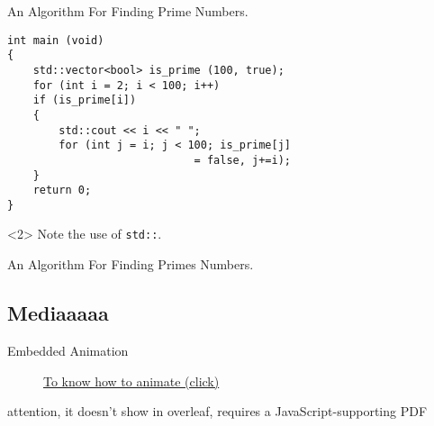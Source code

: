 \begin{frame}[fragile]{An Algorithm For Finding Prime Numbers.} %
    \begin{verbatim} 
int main (void)
{
    std::vector<bool> is_prime (100, true);
    for (int i = 2; i < 100; i++)
    if (is_prime[i])
    {
        std::cout << i << " ";
        for (int j = i; j < 100; is_prime[j]
                             = false, j+=i);
    }
    return 0;
}
    \end{verbatim} %
    
    \begin{uncoverenv}<2>
        Note the use of \verb|std::|.
    \end{uncoverenv}
\end{frame}


\begin{frame}[fragile]{An Algorithm For Finding Primes Numbers.}
    \begin{semiverbatim}
    \end{semiverbatim}
    
\end{frame}


\subsection{Mediaaaaa}


\begin{frame}{Embedded Animation}
    \begin{figure}
        \centering
        \caption{\href{https://tex.stackexchange.com/questions/240243/getting-gif-and-or-moving-images-into-a-latex-presentation}{To know how to animate (click)}}
    \end{figure}

    \centering \large attention, it doesn't show in overleaf, requires a JavaScript-supporting PDF
  
\end{frame}
